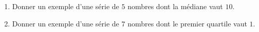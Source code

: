 
\begin{exercice}\label{exoSeconde-0073}

    \begin{enumerate}
        \item
            Donner un exemple d'une série de \( 5\) nombres dont la médiane vaut \( 10\).
        \item
            Donner un exemple d'une série de \( 7\) nombres dont le premier quartile vaut \( 1\).
    \end{enumerate}

\end{exercice}
